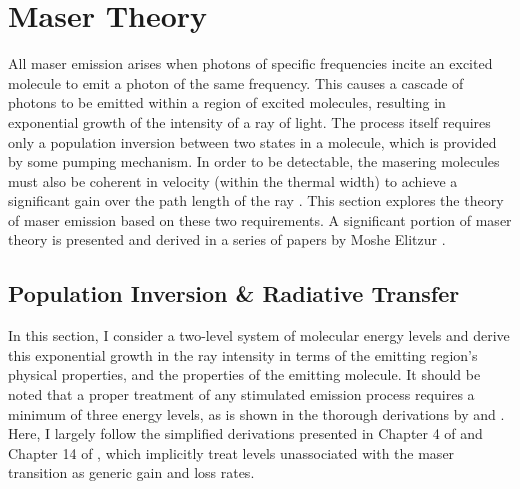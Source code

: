 \section{Maser Theory}
\label{sec:maser_theory}

All maser emission arises when photons of specific frequencies incite an excited molecule to emit a photon of the same frequency.  This causes a cascade of photons to be emitted within a region of excited molecules, resulting in exponential growth of the intensity of a ray of light.  The process itself requires only a population inversion between two states in a molecule, which is provided by some pumping mechanism.  In order to be detectable, the masering molecules must also be coherent in velocity (within the thermal width) to achieve a significant gain over the path length of the ray \citep{lo2005}.  This section explores the theory of maser emission based on these two requirements.  A significant portion of maser theory is presented and derived in a series of papers by Moshe Elitzur \citep{Elitzur_1990,Elitzur_1990_paperI,Elitzur_1990_paperII,Elitzur_1991}.

\subsection{Population Inversion \& Radiative Transfer}
\label{sub:pop_inverse_rad_trans}

In this section, I consider a two-level system of molecular energy levels and derive this exponential growth in the ray intensity in terms of the emitting region's physical properties, and the properties of the emitting molecule. It should be noted that a proper treatment of any stimulated emission process requires a minimum of three energy levels, as is shown in the thorough derivations by \cite{Elitzur_1992} and \cite{Gray_2009}. Here, I largely follow the simplified derivations presented in Chapter 4 of \citet{Elitzur_1992} and Chapter 14 of \citet{stahler_palla_2004}, which implicitly treat levels unassociated with the maser transition as generic gain and loss rates.

